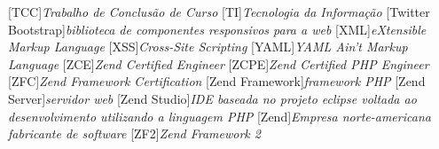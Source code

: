 			[TCC]{\textit{Trabalho de Conclusão de Curso}}
			[TI]{\textit{Tecnologia da Informação}}
[Twitter Bootstrap]{\textit{biblioteca de
componentes responsivos para a web}}
			[XML]{\textit{eXtensible Markup Language}}
			[XSS]{\textit{Cross-Site Scripting}}
			[YAML]{\textit{YAML Ain't Markup Language}}
			[ZCE]{\textit{Zend Certified Engineer}}
			[ZCPE]{\textit{Zend Certified PHP Engineer}}
			[ZFC]{\textit{Zend Framework Certification}}
[Zend Framework]{\textit{framework PHP}}
	[Zend Server]{\textit{servidor web}}
	[Zend Studio]{\textit{IDE baseada no projeto eclipse voltada
ao desenvolvimento utilizando a linguagem PHP}}
			[Zend]{\textit{Empresa norte-americana fabricante de software}}
			[ZF2]{\textit{Zend Framework 2}}